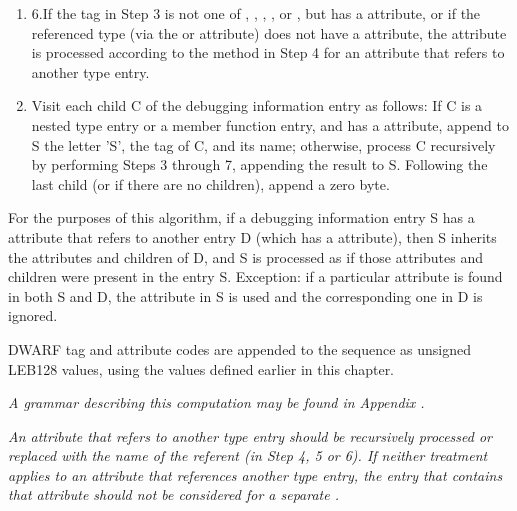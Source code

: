 \begin{enumerate}[1.]
\item 6.If the tag in Step 3 is not one of ,
, 
,
, or 
, but has
a  attribute, or if the referenced type (via
the  or 
 attribute) does not have a
 attribute, the attribute is processed according to
the method in Step 4 for an attribute that refers to another
type entry.


\item Visit each child C of the debugging information
entry as follows: If C is a nested type entry or a member
function entry, and has 
a  attribute, append to
S the letter 'S', the tag of C, and its name; otherwise,
process C recursively by performing Steps 3 through 7,
appending the result to S. Following the last child (or if
there are no children), append a zero byte.
\end{enumerate}



For the purposes of this algorithm, if a debugging information
entry S has a 
attribute that refers to
another entry D (which has a 
attribute),
then S inherits the attributes and children of D, and S is
processed as if those attributes and children were present in
the entry S. Exception: if a particular attribute is found in
both S and D, the attribute in S is used and the corresponding
one in D is ignored.

DWARF tag and attribute codes are appended to the sequence
as unsigned LEB128 values, using the values defined earlier
in this chapter.

\textit{A grammar describing this computation may be found in
Appendix .
}

\textit{An attribute that refers to another type entry should
be recursively processed or replaced with the name of the
referent (in Step 4, 5 or 6). If neither treatment applies to
an attribute that references another type entry, the entry
that contains that attribute should not be considered for a
separate .}

